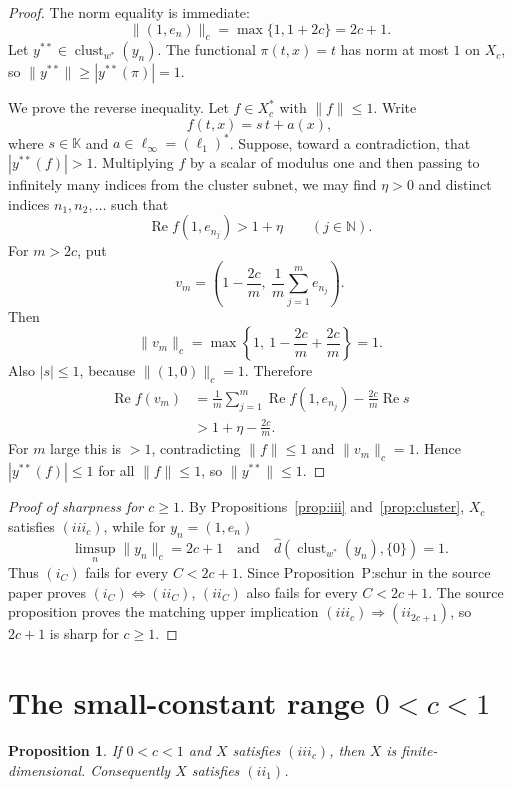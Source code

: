 \documentclass[11pt]{article}
\newtheorem{proposition}{Proposition}
\newcommand{\K}{\mathbb K}
\newcommand{\N}{\mathbb N}
\newcommand{\ellone}{\ell_1}
\newcommand{\clu}{\operatorname{clust}_{w^*}}
\newcommand{\hdist}{\widehat d}
\begin{document}
\begin{proof}
The norm equality is immediate:
\[
  \|(1,e_n)\|_c=\max\{1,1+2c\}=2c+1.
\]
Let \(y^{**}\in\clu(y_n)\).  The functional \(\pi(t,x)=t\) has norm at most
\(1\) on \(X_c\), so \(\|y^{**}\|\ge |y^{**}(\pi)|=1\).

We prove the reverse inequality.  Let \(f\in X_c^*\) with \(\|f\|\le1\).  Write
\[
  f(t,x)=s\,t+a(x),
\]
where \(s\in\K\) and \(a\in\ell_\infty=(\ellone)^*\).  Suppose, toward a
contradiction, that \(|y^{**}(f)|>1\).  Multiplying \(f\) by a scalar of
modulus one and then passing to infinitely many indices from the cluster
subnet, we may find \(\eta>0\) and distinct indices \(n_1,n_2,\dots\) such
that
\[
  \operatorname{Re} f(1,e_{n_j})>1+\eta
  \qquad(j\in\N).
\]
For \(m>2c\), put
\[
  v_m=\left(1-\frac{2c}{m},\ \frac1m\sum_{j=1}^m e_{n_j}\right).
\]
Then
\[
  \|v_m\|_c
  =
  \max\left\{1,\ 1-\frac{2c}{m}+\frac{2c}{m}\right\}
  =1.
\]
Also \(|s|\le1\), because \(\|(1,0)\|_c=1\).  Therefore
\[
\begin{aligned}
  \operatorname{Re} f(v_m)
  &=
  \frac1m\sum_{j=1}^m \operatorname{Re} f(1,e_{n_j})
   -\frac{2c}{m}\operatorname{Re}s  \\
  &> 1+\eta-\frac{2c}{m}.
\end{aligned}
\]
For \(m\) large this is \(>1\), contradicting \(\|f\|\le1\) and
\(\|v_m\|_c=1\).  Hence \(|y^{**}(f)|\le1\) for all \(\|f\|\le1\), so
\(\|y^{**}\|\le1\).
\end{proof}

\begin{proof}[Proof of sharpness for \(c\ge1\)]
By Propositions~\ref{prop:iii} and~\ref{prop:cluster}, \(X_c\) satisfies
\((iii_c)\), while for \(y_n=(1,e_n)\)
\[
  \limsup_n\|y_n\|_c=2c+1
  \quad\text{and}\quad
  \hdist(\clu(y_n),\{0\})=1.
\]
Thus \((i_C)\) fails for every \(C<2c+1\).  Since Proposition~\textup{P:schur}
in the source paper proves \((i_C)\iff(ii_C)\), \((ii_C)\) also fails for
every \(C<2c+1\).  The source proposition proves the matching upper
implication \((iii_c)\Rightarrow(ii_{2c+1})\), so \(2c+1\) is sharp for
\(c\ge1\).
\end{proof}

\section*{The small-constant range \(0<c<1\)}

\begin{proposition}\label{prop:smallc}
If \(0<c<1\) and \(X\) satisfies \((iii_c)\), then \(X\) is finite-dimensional.
Consequently \(X\) satisfies \((ii_1)\).
\end{proposition}
\end{document}
